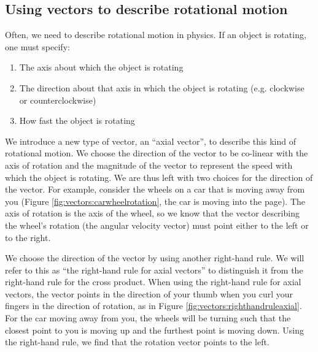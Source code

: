\subsection{Using vectors to describe rotational motion}
\label{sec:Vectors:rotationalmotion}
Often, we need to describe rotational motion in physics. If an object is rotating, one must specify:
\begin{enumerate}
\item The axis about which the object is rotating
\item The direction about that axis in which the object is rotating (e.g. clockwise or counterclockwise)
\item How fast the object is rotating
\end{enumerate}
We introduce a new type of vector, an ``axial vector'', to describe this kind of rotational motion. We choose the direction of the vector to be co-linear with the axis of rotation and the magnitude of the vector to represent the speed with which the object is rotating. We are thus left with two choices for the direction of the vector. For example, consider the wheels on a car that is moving away from you (Figure \ref{fig:vectors:carwheelrotation}, the car is moving into the page).  The axis of rotation is the axis of the wheel, so we know that the vector describing the wheel's rotation (the angular velocity vector) must point either to the left or to the right. 


We choose the direction of the vector by using another right-hand rule. We will refer to this as ``the right-hand rule for axial vectors'' to distinguish it from the right-hand rule for the cross product.  When using the right-hand rule for axial vectors, the vector points in the direction of your thumb when you curl your fingers in the direction of rotation, as in Figure \ref{fig:vectors:righthandruleaxial}. For the car moving away from you, the wheels will be turning such that the closest point to you is moving up and the furthest point is moving down. Using the right-hand rule, we find that the rotation vector points to the left. 


